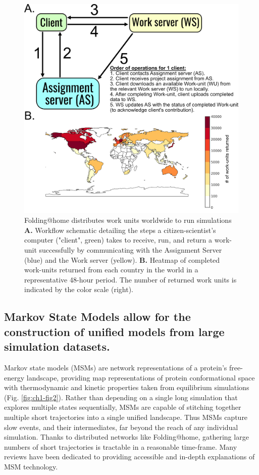 \documentclass[../main.tex]{subfiles}
\begin{document}
        \begin{figure}[!htb] %
            \centering
            \includegraphics[width=5in]{ch1-fig1.png}
            \caption[Folding@home distributes work units worldwide to run simulations]
                {Folding@home distributes work units worldwide to run simulations \textbf{A.} Workflow schematic detailing the steps a citizen-scientist's computer ("client", green) takes to receive, run, and return a work-unit successfully by communicating with the Assignment Server (blue) and the Work server (yellow). \textbf{B.} Heatmap of completed work-units returned from each country in the world in a representative 48-hour period. The number of returned work units is indicated by the color scale (right).}
            \label{fig:ch1-fig1}
        \end{figure}

	\subsection{Markov State Models allow for the construction of unified models from large simulation datasets.}

		Markov state models (MSMs) are network representations of a protein’s free-energy landscape, providing map representations of protein conformational space with thermodynamic and kinetic properties taken from equilibrium simulations (Fig. \ref{fig:ch1-fig2}). Rather than depending on a single long simulation that explores multiple states sequentially, MSMs are capable of stitching together multiple short trajectories into a single unified landscape. Thus MSMs capture slow events, and their intermediates, far beyond the reach of any individual simulation. Thanks to distributed networks like Folding@home, gathering large numbers of short trajectories is tractable in a reasonable time-frame. Many reviews have been dedicated to providing accessible and in-depth explanations of MSM technology\cite{Chodera:2014gk,Husic:2018iz,Knoverek:2018kk}.
\end{document}
